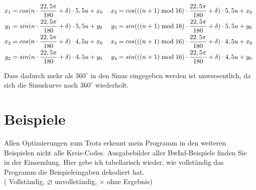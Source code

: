 \begin{gather}
	\begin{split}
		x_1 &= cos(n \cdot \frac{22,5\pi}{180} + \delta) \cdot 5,5u + x_0\\
		y_1 &= sin(n \cdot \frac{22,5\pi}{180} + \delta) \cdot 5,5u + y_0\\ \vspace{2em}
		x_2 &= cos(n \cdot \frac{22,5\pi}{180} + \delta) \cdot 4,5u + x_0\\
		y_2 &= sin(n \cdot \frac{22,5\pi}{180} + \delta) \cdot 4,5u + y_0
	\end{split}
	\hspace{1.2em}
	\begin{split}
		x_3 &= cos(((n+1)\bmod{}16) \cdot \frac{22,5\pi}{180} + \delta) \cdot 5,5u + x_0\\
		y_3 &= sin(((n+1)\bmod{}16) \cdot \frac{22,5\pi}{180} + \delta) \cdot 5,5u + y_0 \\ \vspace{2em}
		x_4 &= cos(((n+1)\bmod{}16) \cdot \frac{22,5\pi}{180} + \delta) \cdot 4,5u + x_0\\
		y_4 &= sin(((n+1)\bmod{}16) \cdot \frac{22,5\pi}{180} + \delta) \cdot 4,5u + y_0
	\end{split} \label{eq:nKoordsNeu}
\end{gather}

Dass dadurch mehr als \(360^{\circ}\) in den Sinus eingegeben werden ist unwsesentlich, da sich die Sinuskurve nach \(360^{\circ}\) wiederholt.
\pagebreak
\section{Beispiele}
Allen Optimierungen zum Trotz erkennt mein Programm in den weiteren Beispielen nicht alle Kreis-Codes. Ausgabebilder aller BwInf-Beispiele finden Sie in der Einsendung. Hier gebe ich tabellarisch wieder, wie vollständig das Programm die Beispieleingaben dekodiert hat. \\ 
(\checkmark{} Vollständig, \(\varnothing\) unvollständig, \(\times\) ohne Ergebnis)

